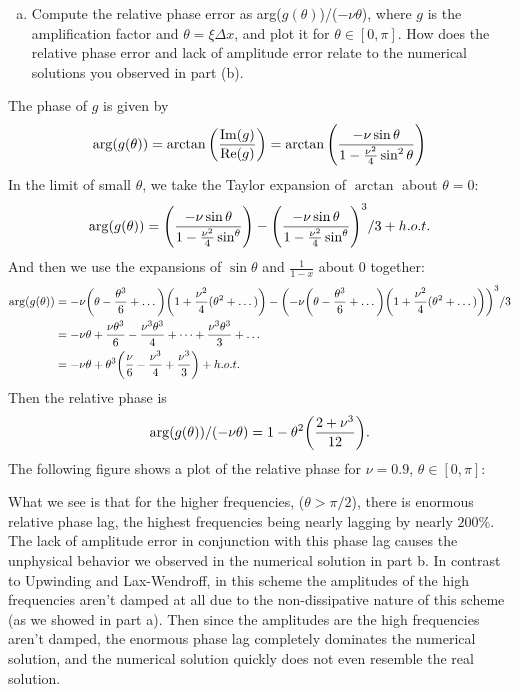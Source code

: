 \documentclass[12pt]{article}
\begin{document}
\begin{enumerate}[(a)]
\begin{figure}[H]
\end{figure} 
\newpage
\item Compute the relative phase error as arg($g(\theta)$)/($-\nu\theta$), where $g$ is the amplification factor and $\theta = \xi\Delta x$, and plot it for $\theta\in[0,\pi]$.  How does the relative phase error and lack of amplitude error relate to the numerical solutions you observed in part (b).
\end{enumerate}

The phase of $g$ is given by
$$\arg(g(\theta)) = \arctan\qty(\dfrac{\Im(g)}{\Re(g)})= \arctan\qty(\dfrac{-\nu\sin\theta}{1-\frac{\nu^2}{4}\sin^2\theta}) $$
In the limit of small $\theta$, we take the Taylor expansion of $\arctan$ about $\theta=0$:
$$\arg(g(\theta)) = \qty(\dfrac{-\nu\sin\theta}{1-\frac{\nu^2}{4}\sin^\theta}) - \qty(\dfrac{-\nu\sin\theta}{1-\frac{\nu^2}{4}\sin^\theta})^3/3 + h.o.t.$$
And then we use the expansions of $\sin\theta$ and $\frac{1}{1-x}$ about 0 together:
\begin{align*}
\arg(g(\theta)) &= -\nu\qty(\theta-\frac{\theta^3}{6}+\dots)\qty(1+\frac{\nu^2}{4}(\theta^2 + \dots)) - \qty(-\nu\qty(\theta-\frac{\theta^3}{6}+\dots)\qty(1+\frac{\nu^2}{4}(\theta^2 + \dots)))^3/3 \\
&= -\nu \theta + \frac{\nu\theta^3}{6} - \frac{\nu^3\theta^3}{4} + \dots + \dfrac{\nu^3\theta^3}{3} + \dots \\
&= -\nu \theta + \theta^3\qty(\frac{\nu}{6} - \frac{\nu^3}{4}+\dfrac{\nu^3}{3}) + h.o.t.
\end{align*}
Then the relative phase is 
$$\arg(g(\theta))/(-\nu\theta) = 1 - \theta^2\qty(\dfrac{2+\nu^3}{12}).$$
The following figure shows a plot of the relative phase for $\nu=0.9$, $\theta \in [0,\pi]$:
\begin{figure}[H]
\centering{}\end{figure}
What we see is that for the higher frequencies, ($\theta >\pi/2$), there is enormous relative phase lag, the highest frequencies being nearly lagging by nearly $200\%$.  The lack of amplitude error in conjunction with this phase lag causes the unphysical behavior we observed in the numerical solution in part b.  In contrast to Upwinding and Lax-Wendroff, in this scheme the amplitudes of the high frequencies aren't damped at all due to the non-dissipative nature of this scheme (as we showed in part a).  Then since the amplitudes are the high frequencies aren't damped, the enormous phase lag completely dominates the numerical solution, and the numerical solution quickly does not even resemble the real solution.
\end{document}
